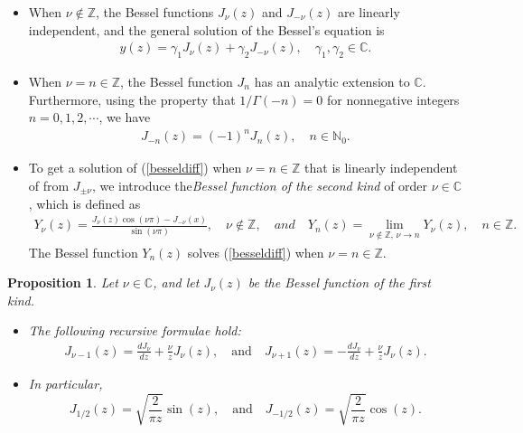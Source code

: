 \documentclass{article}
\numberwithin{equation}{section}
\newcommand{\bbC}{\mathbb{C}}
\newcommand{\bbN}{\mathbb{N}}
\newcommand{\bbZ}{\mathbb{Z}}
\theoremstyle{plain}
\newtheorem{proposition}[theorem]{Proposition}
\theoremstyle{definition}
\begin{document}
\begin{itemize}
\item When $\nu\notin\bbZ$, the Bessel functions $J_\nu(z)$ and $J_{-\nu}(z)$ are linearly independent, and the general solution of the Bessel's equation is 
\begin{align*}
	y(z)=\gamma_1 J_\nu(z)+\gamma_2 J_{-\nu}(z),\quad \gamma_1,\gamma_2\in\bbC.
\end{align*}
\item When $\nu=n\in\bbZ$, the Bessel function $J_n$ has an analytic extension to $\bbC$. Furthermore, using the property that $1/\Gamma(-n)=0$ for nonnegative integers $n=0,1,2,\cdots$, we have
\begin{align*}
	J_{-n}(z)=(-1)^n J_n(z),\quad n\in\bbN_0.
\end{align*}
\item To get a solution of (\ref{besseldiff}) when $\nu=n\in\bbZ$ that is linearly independent of from $J_{\pm\nu}$, we introduce the\textit{Bessel function of the second kind} of order $\nu\in\bbC$, which is defined as 
\begin{align*}
	Y_\nu(z)=\frac{J_\nu(z)\cos(\nu\pi)-J_{-\nu}(x)}{\sin(\nu\pi)},\quad\nu\notin\bbZ,\quad and\quad Y_n(z)=\lim_{\nu\notin\bbZ,\,\nu\to n}Y_\nu(z),\quad n\in\bbZ.
\end{align*}
The Bessel function $Y_n(z)$ solves (\ref{besseldiff}) when $\nu=n\in\bbZ$.
\end{itemize}
\begin{proposition}\label{besselprop1}
Let $\nu\in\bbC$, and let $J_\nu(z)$ be the Bessel function of the first kind.
\begin{itemize}
\item[(i)] The following recursive formulae hold:
\begin{align*}
	J_{\nu-1}(z)=\frac{dJ_\nu}{dz}+\frac{\nu}{z}J_\nu(z),\quad\mathrm{and}\quad J_{\nu+1}(z)=-\frac{dJ_\nu}{dz}+\frac{\nu}{z}J_\nu(z).
\end{align*}
\item[(ii)] In particular, $$J_{1/2}(z)=\sqrt{\frac{2}{\pi z}}\sin(z),\quad\mathrm{and}\quad J_{-1/2}(z)=\sqrt{\frac{2}{\pi z}}\cos(z).$$
\end{itemize}
\end{proposition}
\end{document}
